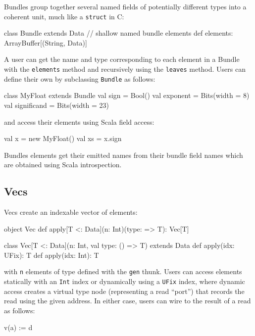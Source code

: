 \documentclass[10pt,twocolumn]{article}
\def\code#1{{\small\tt #1}}
\begin{document}
Bundles group together several named fields of potentially different
types into a coherent unit, much like a \code{struct} in C:

\begin{scala}
class Bundle extends Data {
  // shallow named bundle elements
  def elements: ArrayBuffer[(String, Data)]
}
\end{scala}

\noindent
A user can get the name and type corresponding to each element in a
Bundle with the \code{elements} method and recursively using the
\code{leaves} method. 
Users can define their own by subclassing \code{Bundle} as follows:

\begin{scala}
class MyFloat extends Bundle {
  val sign        = Bool()
  val exponent    = Bits(width = 8)
  val significand = Bits(width = 23)
}
\end{scala}

\noindent
and access their elements using Scala field access:

\begin{scala}
val x  = new MyFloat()
val xs = x.sign
\end{scala}

Bundles elements get their emitted names from their bundle field names
which are obtained using Scala introspection.

\subsection{Vecs}

Vecs create an indexable vector of elements: 

\begin{scala}
object Vec {
  def apply[T <: Data](n: Int)(type: => T): Vec[T]
}

class Vec[T <: Data](n: Int, val type: () => T) 
    extends Data {
  def apply(idx: UFix): T
  def apply(idx: Int): T
}
\end{scala}

\noindent
with \code{n} elements of type defined with the \code{gen} thunk.
Users can access elements statically with an \code{Int} index or
dynamically using a \code{UFix} index, 
where dynamic access creates a virtual type node (representing a read
``port'') that records the read using the given address.  In either case,
users can wire to the result of a read as follows:

\begin{scala}
v(a) := d
\end{scala}
\end{document}
